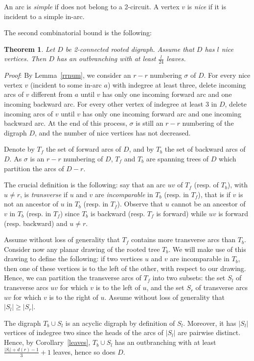 \documentclass{article}
\newtheorem{theorem}{Theorem}
\begin{document}
An arc is \emph{simple} if does not belong to a 2-circuit. A vertex $v$
is \emph{nice} if it is incident
to a simple in-arc. 

The second combinatorial bound is the following:
\begin{theorem}\label{bound2}
Let $D$ be 2-connected rooted digraph. Assume that $D$ has $l$ nice vertices. Then $D$ has an outbranching with at least $\frac{l}{24}$ leaves.
\end{theorem}
\emph{Proof}:
By Lemma~\ref{rrnum}, we consider an $r-r$ numbering $\sigma$ of $D$.
For every nice vertex $v$
(incident
to some in-arc $a$) with indegree at least three, delete incoming arcs
of $v$ different from $a$ until $v$ has only one incoming forward arc
and one incoming backward arc. For every other vertex of indegree at
least 3 in $D$, delete incoming arcs of $v$ until $v$ has only one
incoming forward arc and one incoming backward arc. At the end of this
process, $\sigma$ is still an $r-r$ numbering of the digraph $D$, and
the number of nice vertices has not decreased.

Denote by $T_f$ the set of forward arcs of $D$, and by $T_b$ the set of
backward arcs of $D$. As $\sigma$ is an $r-r$ numbering of $D$, $T_f$
and $T_b$ are spanning trees of $D$ which partition the arcs of $D-r$.

The crucial definition is the following: say that an arc $uv$ of $T_f$
(resp. of $T_b$), with $u\neq r$, is \emph{transverse} if $u$ and $v$
are \emph{incomparable} in $T_b$ (resp. in $T_f$), that is if $v$ is not
an ancestor of $u$ in $T_b$ (resp. in $T_f$). Observe that $u$ cannot be
an ancestor of $v$ in $T_b$ (resp. in $T_f$) since $T_b$ is backward (resp. $T_f$ is forward) while $uv$
is forward (resp. backward) and $u\neq r$.

Assume without loss of generality that $T_f$ contains more transverse
arcs than $T_b$. Consider now any planar
drawing of the rooted tree $T_b$. We will make use of this drawing to
define the following:
if two vertices $u$ and $v$ are incomparable in $T_b$, then one of these
vertices is to the left of the other, with respect to our drawing.
Hence, we can
partition the transverse arcs of $T_f$ into two subsets: the set $S_l$
of transverse arcs
$uv$ for which $v$ is to the left of $u$, and the set $S_r$ of
transverse arcs
$uv$ for which $v$ is to the right of $u$. Assume without loss of
generality that $|S_l|\ge |S_r|$.

The digraph $T_b\cup S_l$ is an acyclic digraph by definition of $S_l$.
Moreover,
it has $|S_l|$ vertices of indegree two since the heads of the arcs of
$|S_l|$
are pairwise distinct. Hence, by Corollary~\ref{leaves}, $T_b\cup S_l$
has an outbranching
with at least $\frac{|S_l|+d(r)-1}{3}+1$ leaves, hence so does $D$.
\end{document}
